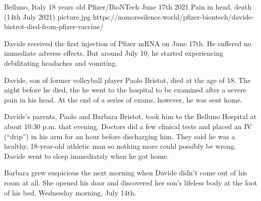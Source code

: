 {Belluno, Italy}
{18 years old}
{Pfizer/BioNTech}
{June 17th 2021}
{Pain in head, death (14th July 2021)}
{picture.jpg}
{https://nomoresilence.world/pfizer-biontech/davide-bistrot-died-from-pfizer-vaccine/}
{

Davide received the first injection of Pfizer mRNA on June 17th. He suffered no
immediate adverse effects. But around July 10, he started experiencing
debilitating headaches and vomiting.

Davide, son of former volleyball player Paolo Bristot, died at the age of
18. The night before he died, the he went to the hospital to be examined after a
severe pain in his head. At the end of a series of exams, however, he was sent
home.

Davide’s parents, Paolo and Barbara Bristot, took him to the Belluno Hospital at
about 10:30 p.m. that evening. Doctors did a few clinical tests and placed an IV
(“drip”) in his arm for an hour before discharging him. They said he was a
healthy, 18-year-old athletic man so nothing more could possibly be
wrong. Davide went to sleep immediately when he got home.

Barbara grew suspicious the next morning when Davide didn’t come out of his room
at all. She opened his door and discovered her son’s lifeless body at the foot
of his bed, Wednesday morning, July 14th.

}
